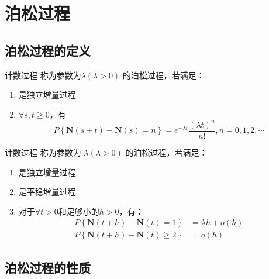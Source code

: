 \section{泊松过程}
    \subsection{泊松过程的定义}
        \begin{definition}[泊松过程]
            计数过程 \CountingProcess 称为参数为$\lambda(\lambda > 0)$ 的泊松过程，若满足：
            \begin{enumerate}[label=(\arabic*).]
                \item \CountingProcess 是独立增量过程
                \item $\forall s, t \geq 0$，有 $$ P\left\{ \textbf{N}(s + t) - \textbf{N}(s) = n \right\} = e^{-\lambda t} \frac{(\lambda t)^n}{n !} , n = 0, 1, 2, \cdots $$
            \end{enumerate}
        \end{definition}

        \begin{definition}[泊松过程]
            计数过程 \CountingProcess 称为参数为 $\lambda (\lambda > 0)$ 的泊松过程，若满足：
            \begin{enumerate}[label=(\arabic*).]
                \item \CountingProcess 是独立增量过程
                \item \CountingProcess 是平稳增量过程
                \item 对于$\forall t>0$和足够小的$h > 0$，有：
                \begin{align*}
                    P\left\{ \textbf{N}(t + h) - \textbf{N}(t) = 1 \right\} &= \lambda h + o(h) \\
                    P\left\{ \textbf{N}(t + h) - \textbf{N}(t) \geq 2 \right\} &= o(h)
                \end{align*}

            \end{enumerate}
        \end{definition}
    \subsection{泊松过程的性质}
